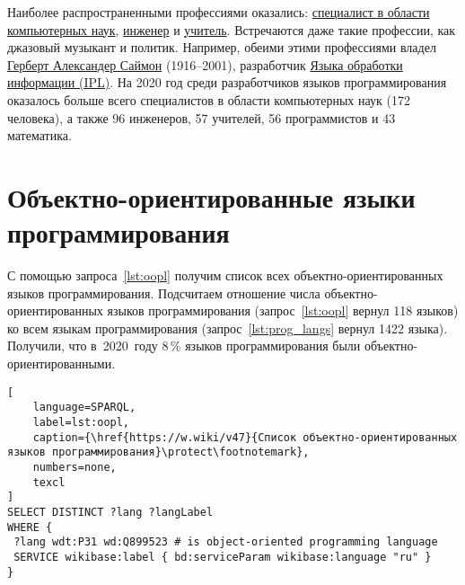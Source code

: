 Наиболее распространенными профессиями оказались: 
\href{https://www.wikidata.org/wiki/Q21198}{специалист в области компьютерных наук}, 
\href{https://www.wikidata.org/wiki/Q81096}{инженер} 
и \href{https://www.wikidata.org/wiki/Q37226}{учитель}. 
Встречаются даже такие профессии, как джазовый музыкант и политик. 
Например, обеими этими профессиями владел 
\href{https://www.wikidata.org/wiki/Q181529}{Герберт Александер Саймон} (1916--2001), 
разработчик \href{https://en.wikipedia.org/wiki/Information_Processing_Language}{Языка обработки информации (IPL)}. 
На 2020 год среди разработчиков языков программирования оказалось больше всего специалистов 
в области компьютерных наук (172 человека), а также 96 инженеров, 57 учителей, 56 программистов и 43 математика.




\section{Объектно-ориентированные языки программирования}

С помощью запроса~\ref{lst:oopl} 
получим список всех объектно-ориентированных языков программирования. 
Подсчитаем отношение числа объектно-ориентированных языков программирования 
(запрос~\ref{lst:oopl} вернул 118 языков) 
ко всем языкам программирования 
(запрос~\ref{lst:prog_langs} вернул 1422 языка).
Получили, что в~2020~году 8\,\% языков программирования были объектно-ориентированными. 

\begin{lstlisting}[
	language=SPARQL,
	label=lst:oopl,
	caption={\href{https://w.wiki/v47}{Список объектно-ориентированных языков программирования}\protect\footnotemark},
    numbers=none,
	texcl
]
SELECT DISTINCT ?lang ?langLabel
WHERE {
 ?lang wdt:P31 wd:Q899523 # is object-oriented programming language
 SERVICE wikibase:label { bd:serviceParam wikibase:language "ru" }
}
\end{lstlisting}







